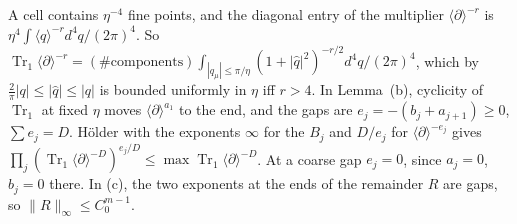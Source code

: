 \begin{detail}\label{d11a:F12}
A cell contains $\eta^{-4}$ fine points, and the diagonal entry of the multiplier $\langle\partial\rangle^{-r}$ is $\eta^4\int\langle q\rangle^{-r}d^4q/(2\pi)^4$. So $\operatorname{Tr}_1\langle\partial\rangle^{-r}=(\#\text{components})\int_{|q_\mu|\le\pi/\eta}(1+|\hat q|^2)^{-r/2}d^4q/(2\pi)^4$, which by $\frac2\pi|q|\le|\hat q|\le|q|$ is bounded uniformly in $\eta$ iff $r>4$. In Lemma~(b), cyclicity of $\operatorname{Tr}_1$ at fixed $\eta$ moves $\langle\partial\rangle^{a_1}$ to the end, and the gaps are $e_j=-(b_j+a_{j+1})\ge0$, $\sum e_j=D$. H\"older with the exponents $\infty$ for the $B_j$ and $D/e_j$ for $\langle\partial\rangle^{-e_j}$ gives $\prod_j(\operatorname{Tr}_1\langle\partial\rangle^{-D})^{e_j/D}\le\max\operatorname{Tr}_1\langle\partial\rangle^{-D}$. At a coarse gap $e_j=0$, since $a_j=0$, $b_j=0$ there. In (c), the two exponents at the ends of the remainder $R$ are gaps, so $\|R\|_\infty\le C_0^{m-1}$.
\end{detail}

